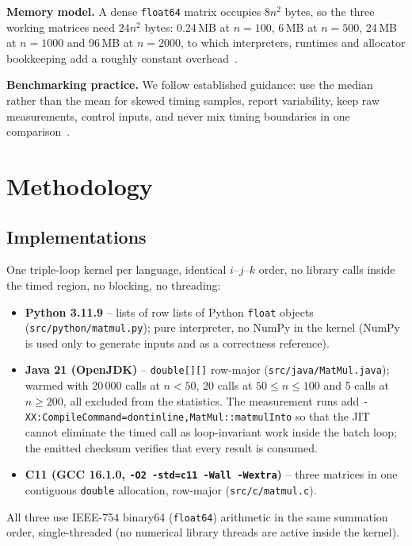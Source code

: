 \documentclass[11pt,a4paper]{article}
\begin{document}
\textbf{Memory model.} A dense \texttt{float64} matrix occupies $8n^2$ bytes, so the
three working matrices need $24n^2$ bytes: 0.24\,MB at $n=100$, 6\,MB at $n=500$,
24\,MB at $n=1000$ and 96\,MB at $n=2000$, to which interpreters, runtimes and
allocator bookkeeping add a roughly constant overhead~\cite{strang2016}.

\textbf{Benchmarking practice.} We follow established guidance: use the median
rather than the mean for skewed timing samples, report variability, keep raw
measurements, control inputs, and never mix timing boundaries in one
comparison~\cite{fleming1986,mytkowicz2009}.

\section{Methodology}

\subsection{Implementations}

One triple-loop kernel per language, identical $i$--$j$--$k$ order, no library
calls inside the timed region, no blocking, no threading:

\begin{itemize}
  \item \textbf{Python 3.11.9} -- lists of row lists of Python \texttt{float}
        objects (\texttt{src/python/matmul.py}); pure interpreter, no NumPy in the
        kernel (NumPy is used only to generate inputs and as a correctness
        reference).
  \item \textbf{Java 21 (OpenJDK)} -- \texttt{double[][]} row-major
        (\texttt{src/java/MatMul.java}); warmed with 20\,000 calls at $n<50$,
        20 calls at $50 \le n \le 100$ and 5 calls at $n \ge 200$, all excluded
        from the statistics. The measurement runs add
        \texttt{-XX:CompileCommand=\hspace{0pt}dontinline,MatMul::matmulInto} so that the JIT
        cannot eliminate the timed call as loop-invariant work inside the batch
        loop; the emitted checksum verifies that every result is consumed.
  \item \textbf{C11 (GCC 16.1.0, \texttt{-O2 -std=c11 -Wall -Wextra})} -- three
        matrices in one contiguous \texttt{double} allocation, row-major
        (\texttt{src/c/matmul.c}).
\end{itemize}

All three use IEEE-754 binary64 (\texttt{float64}) arithmetic in the same
summation order, single-threaded (no numerical library threads are active inside
the kernel).
\end{document}
